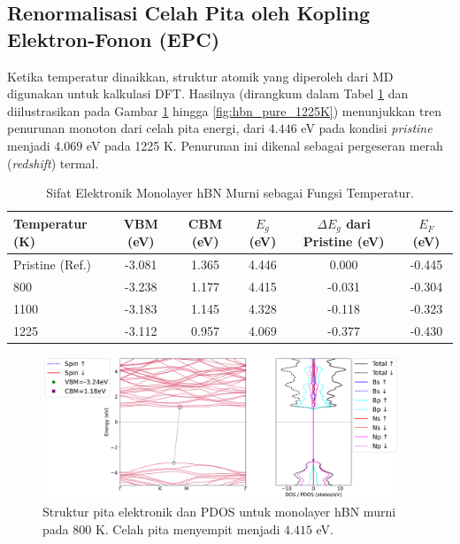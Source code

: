 \subsection{Renormalisasi Celah Pita oleh Kopling Elektron-Fonon (EPC)}
\label{subsec:hbn_murni_termal}
Ketika temperatur dinaikkan, struktur atomik yang diperoleh dari MD digunakan untuk kalkulasi DFT.
Hasilnya (dirangkum dalam Tabel \ref{tab:hbn_murni_suhu} dan diilustrasikan pada Gambar \ref{fig:hbn_pure_800K} hingga \ref{fig:hbn_pure_1225K}) menunjukkan tren penurunan monoton dari celah pita energi, dari $4.446$ eV pada kondisi \emph{pristine} menjadi $4.069$ eV pada 1225 K. Penurunan ini dikenal sebagai pergeseran merah (\emph{redshift}) termal.
\begin{table}[htbp!] %
  \centering
  \caption{Sifat Elektronik Monolayer hBN Murni sebagai Fungsi Temperatur.}
  \label{tab:hbn_murni_suhu}
  \begin{tabular}{lccccc}
    \toprule
    Temperatur (K) & VBM (eV) & CBM (eV) & $E_g$ (eV) & $\Delta E_g$ dari Pristine (eV) & $E_F$ (eV) \\
    \midrule
    Pristine (Ref.) & -3.081 &  1.365 & 4.446 &  0.000 & -0.445 \\
    800             & -3.238 &  1.177 & 4.415 & -0.031 & -0.304 \\
    1100            & -3.183 &  1.145 & 4.328 & -0.118 & -0.323 \\
    1225            & -3.112 &  0.957 & 4.069 & -0.377 & -0.430 \\
    \bottomrule
  \end{tabular}
\end{table}

\begin{figure}[htbp!] %
    \centering
    \includegraphics[width=0.95\textwidth]{gambar_hasil/simple_bands_pdos_pure_800K.png}
    \caption{Struktur pita elektronik dan PDOS untuk monolayer hBN murni pada 800 K. Celah pita menyempit menjadi $4.415$ eV.}
    \label{fig:hbn_pure_800K}
\end{figure}

